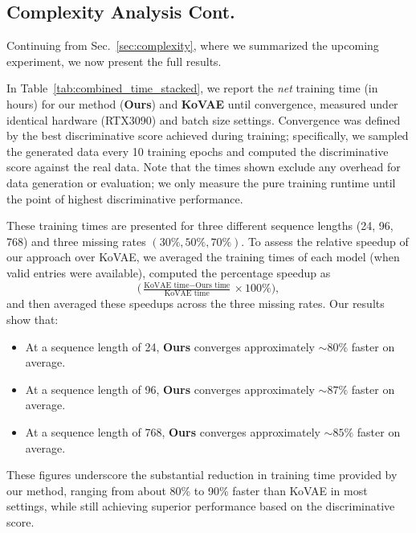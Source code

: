 \documentclass{article}
\theoremstyle{plain}
\theoremstyle{definition}
\theoremstyle{remark}
\begin{document}
{\begin{table}[!t]
{\begin{tabular}{cc|ccc|ccc|ccc}
        \bottomrule
    \end{tabular}}
\end{table}


\clearpage

\subsection{Complexity Analysis Cont.}
\label{sec:complexity_analyis_cont}
Continuing from Sec.~\ref{sec:complexity}, where we summarized the upcoming experiment, we now present the full results.

In Table~\ref{tab:combined_time_stacked}, we report the  \emph{net} training time (in hours) for our method (\textbf{Ours}) and \textbf{KoVAE} until convergence, measured under identical hardware (RTX3090) and batch size settings. Convergence was defined by the best discriminative score achieved during training; specifically, we sampled the generated data every 10 training epochs and computed the discriminative score against the real data. Note that the times shown exclude any overhead for data generation or evaluation; we only measure the pure training runtime until the point of highest discriminative performance.

These training times are presented for three different sequence lengths (24, 96, 768) and three missing rates $(30\%, 50\%, 70\%)$. To assess the relative speedup of our approach over KoVAE, we averaged the training times of each model (when valid entries were available), computed the percentage speedup as 
\[
  \bigl(\tfrac{\text{KoVAE time} - \text{Ours time}}{\text{KoVAE time}} \times 100\%\bigr),
\]
and then averaged these speedups across the three missing rates. Our results show that:
\begin{itemize}
    \item At a sequence length of 24, \textbf{Ours} converges approximately \(\sim80\%\) faster on average.
    \item At a sequence length of 96, \textbf{Ours} converges approximately \(\sim87\%\) faster on average.
    \item At a sequence length of 768, \textbf{Ours} converges approximately \(\sim85\%\) faster on average.
\end{itemize}

These figures underscore the substantial reduction in training time provided by our method, ranging from about 80\% to 90\% faster than KoVAE in most settings, while still achieving superior performance based on the discriminative score. 

}
\end{document}
